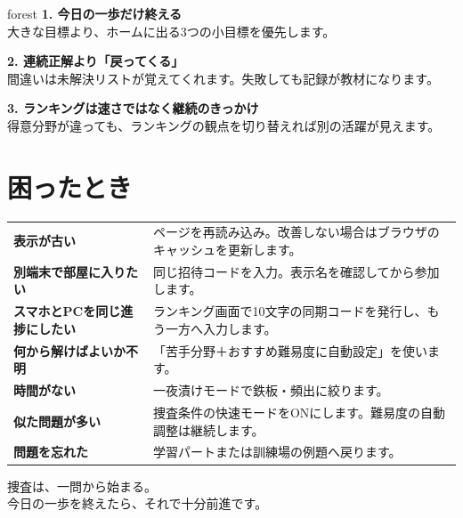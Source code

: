 \documentclass[11pt,a4paper]{ltjsarticle}
\begin{document}
\begin{casebox}[1日5分でも捜査は進む]{forest}
\textbf{1. 今日の一歩だけ終える}\\
大きな目標より、ホームに出る3つの小目標を優先します。

\textbf{2. 連続正解より「戻ってくる」}\\
間違いは未解決リストが覚えてくれます。失敗しても記録が教材になります。

\textbf{3. ランキングは速さではなく継続のきっかけ}\\
得意分野が違っても、ランキングの観点を切り替えれば別の活躍が見えます。
\end{casebox}

\section*{困ったとき}

\begin{tabularx}{\linewidth}{>{\bfseries}p{42mm}X}
表示が古い & ページを再読み込み。改善しない場合はブラウザのキャッシュを更新します。\\
別端末で部屋に入りたい & 同じ招待コードを入力。表示名を確認してから参加します。\\
スマホとPCを同じ進捗にしたい & ランキング画面で10文字の同期コードを発行し、もう一方へ入力します。\\
何から解けばよいか不明 & 「苦手分野＋おすすめ難易度に自動設定」を使います。\\
時間がない & 一夜漬けモードで鉄板・頻出に絞ります。\\
似た問題が多い & 捜査条件の快速モードをONにします。難易度の自動調整は継続します。\\
問題を忘れた & 学習パートまたは訓練場の例題へ戻ります。\\
\end{tabularx}

\vfill
\begin{center}
{\titlejp\Large 捜査は、一問から始まる。}\\[2mm]
{\color{muted}今日の一歩を終えたら、それで十分前進です。}
\end{center}
\end{document}
